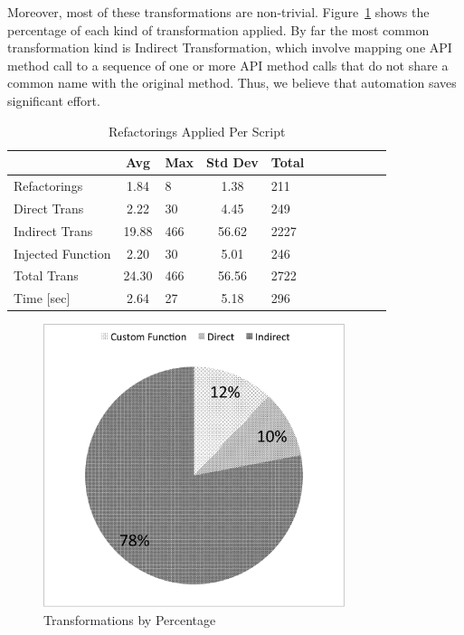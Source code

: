 \documentclass[article]{sigplanconf}
\begin{document}
Moreover, most of these transformations are non-trivial. Figure~\ref{fig:transformations_pieChart} shows the percentage of each kind of transformation applied. By far the most common transformation kind is Indirect Transformation, which involve mapping one API method call to a sequence of one or more API method calls that do not share a common name with the original method. Thus, we believe that automation saves significant effort.

\begin{table}[htdp]
\begin{center}
\begin{tabular}{lclclclclc||c|}

 & Avg & Max & Std Dev & Total\\
\hline
Refactorings & 1.84 & 8 & 1.38 & 211 \\
\hline
Direct Trans & 2.22 & 30 & 4.45 & 249\\

Indirect Trans & 19.88  & 466 & 56.62 & 2227\\

Injected Function & 2.20 & 30 & 5.01 & 246 \\
\hline
Total Trans & 24.30 & 466 & 56.56 & 2722 \\
\hline
Time [sec] & 2.64 & 27 & 5.18 & 296\\


\end{tabular}
\nocaptionrule
\caption{Refactorings Applied Per Script}
\label{table:avgTrans}
\end{center}
\end{table}%

\begin{figure}[htbp!]
\begin{center}
\includegraphics[width=250pt]{images/TransformationsChart}
\nocaptionrule
\caption{Transformations by Percentage}
\label{fig:transformations_pieChart}
\end{center}
\end{figure}
\end{document}
